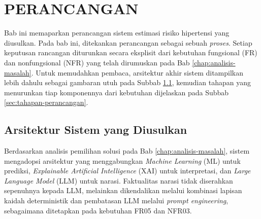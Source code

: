 \cleardoublepage
\chapter{PERANCANGAN}
\label{chap:desain-konsep-solusi}

\newcommand{\bivplaceholder}[1]{%
    \fbox{\begin{minipage}[c][4.8cm][c]{0.85\textwidth}\centering
    \textbf{[ PLACEHOLDER GAMBAR ]}\par\vspace{4pt}\footnotesize\itshape #1\end{minipage}}%
}

Bab ini memaparkan perancangan sistem estimasi risiko hipertensi yang diusulkan. Pada bab ini, ditekankan perancangan sebagai sebuah \emph{proses}. Setiap keputusan rancangan diturunkan secara eksplisit dari kebutuhan fungsional (FR) dan nonfungsional (NFR) yang telah dirumuskan pada Bab \ref{chap:analisis-masalah}. Untuk memudahkan pembaca, arsitektur akhir sistem ditampilkan lebih dahulu sebagai gambaran utuh pada Subbab \ref{sec:arsitektur-usulan}, kemudian tahapan yang menurunkan tiap komponennya dari kebutuhan dijelaskan pada Subbab \ref{sec:tahapan-perancangan}.

\section{Arsitektur Sistem yang Diusulkan}
\label{sec:arsitektur-usulan}
Berdasarkan analisis pemilihan solusi pada Bab \ref{chap:analisis-masalah}, sistem mengadopsi arsitektur yang menggabungkan \textit{Machine Learning} (ML) untuk prediksi, \textit{Explainable Artificial Intelligence} (XAI) untuk interpretasi, dan \textit{Large Language Model} (LLM) untuk narasi. Faktualitas narasi tidak diserahkan sepenuhnya kepada LLM, melainkan dikendalikan melalui kombinasi lapisan kaidah deterministik dan pembatasan LLM melalui \textit{prompt engineering}, sebagaimana ditetapkan pada kebutuhan FR05 dan NFR03.

